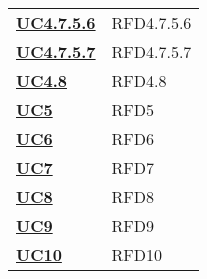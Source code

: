 \begin{longtable}[H]{| >{\centering\bfseries}p{8cm} | >{\centering\arraybackslash}p{8cm} |}
    \hyperref[spar:uc4.7.5.6]{UC4.7.5.6} & RFD4.7.5.6 \\

    \hyperref[spar:uc4.7.5.7]{UC4.7.5.7} & RFD4.7.5.7 \\

    \hyperref[ssub:uc4.8]{UC4.8} & RFD4.8 \\

    \hyperref[sub:uc5]{UC5} & RFD5 \\

    \hyperref[sub:uc6]{UC6} & RFD6 \\

    \hyperref[sub:uc7]{UC7} & RFD7 \\

    \hyperref[sub:uc8]{UC8} & RFD8 \\

    \hyperref[sub:uc9]{UC9} & RFD9 \\

    \hyperref[sub:uc10]{UC10} & RFD10 \\


\end{longtable}
